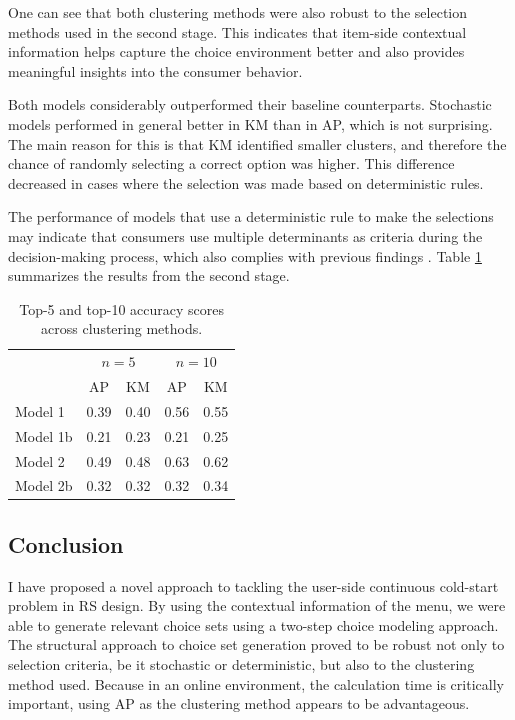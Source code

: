\documentclass[a4paper,12pt]{article}
\begin{document}
One can see that both clustering methods were also robust to the selection methods used in the second stage. This indicates that item-side contextual information helps capture the choice environment better and also provides meaningful insights into the consumer behavior.
 
Both models considerably outperformed their baseline counterparts. Stochastic models performed in general better in KM than in AP, which is not surprising. The main reason for this is that KM identified smaller clusters, and therefore the chance of randomly selecting a correct option was higher. This difference decreased in cases where the selection was made based on deterministic rules.

The performance of models that use a deterministic rule to make the selections may indicate that consumers use multiple determinants as criteria during the decision-making process, which also complies with previous findings \citep{bettman1979memory, lee2004effect}. Table \ref{tab:mainResultsTwoStageModeling} summarizes the results from the second stage.

\begin{table}
    \centering
    \begin{tabular}{lcccc}\hline
     & \multicolumn{2}{c}{$n=5$} & \multicolumn{2}{c}{$n=10$}\\
     & AP & KM & AP & KM\\\hline
    Model 1\hspace{20mm} & 0.39 & 0.40 & 0.56 & 0.55\\
    Model 1b & 0.21 & 0.23 & 0.21 & 0.25\\
    Model 2 & 0.49 & 0.48 & 0.63 & 0.62\\
    Model 2b & 0.32 & 0.32 & 0.32 & 0.34\\\hline
    \end{tabular}
    \caption{Top-5 and top-10 accuracy scores across clustering methods.}
    \label{tab:mainResultsTwoStageModeling}
\end{table}

\subsection{Conclusion}

I have proposed a novel approach to tackling the user-side continuous cold-start problem in RS design. By using the contextual information of the menu, we were able to generate relevant choice sets using a two-step choice modeling approach. The structural approach to choice set generation proved to be robust not only to selection criteria, be it stochastic or deterministic, but also to the clustering method used. Because in an online environment, the calculation time is critically important, using AP as the clustering method appears to be advantageous.
\end{document}
